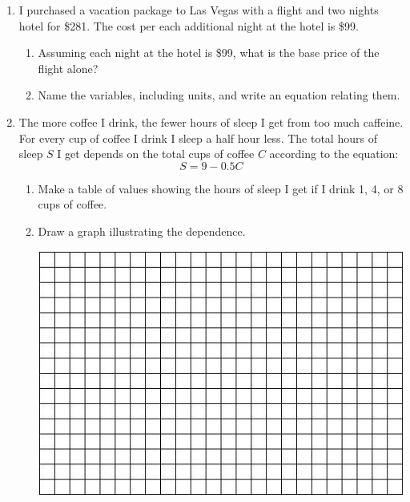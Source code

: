 \documentclass[12pt]{article}
\begin{document}
\begin{enumerate}
\item I purchased a vacation package to Las Vegas with a flight and two nights hotel for \$281.  The cost per each additional night at the hotel is \$99.  

\begin{enumerate}
\item Assuming each night at the hotel is \$99, what is the base price of the flight alone?
\vfill

\item Name the variables, including units, and write an equation relating them.
\vfill
\vfill
\end{enumerate}

\newpage %
\item The more coffee I drink, the fewer hours of sleep I get from too much caffeine.  For every cup of coffee I drink I sleep a half hour less.  The total hours of sleep $S$ I get depends on the total cups of coffee $C$ according to the equation: $$S=9-0.5C$$

\begin{enumerate}
\item Make a table of values showing the hours of sleep I get if I drink 1, 4, or 8 cups of coffee. 
\vfill
\vfill
\item Draw a graph illustrating the dependence.  

\vspace{.1in}
\begin{center}
 {\includegraphics [width = 6in] {../GraphPaper}}
\end{center}
\vspace{.1in}


\end{enumerate}
\end{enumerate}
\end{document}
